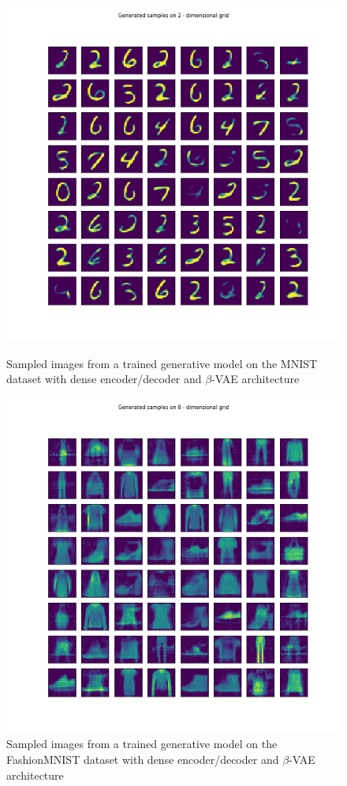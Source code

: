 \documentclass[12pt, english]{article}
\begin{document}
\begin{figure}[ht] 
  \begin{minipage}{0.48\linewidth}
    \centering
    \includegraphics[width=.65\linewidth]{gen/generated_samples_mnist_dense_vae.png}
    \caption{Sampled images from a trained generative model on the MNIST dataset with dense encoder/decoder and $\beta$-VAE architecture}
    \label{fig:sampled-images-1}
  \end{minipage}\hfill
  \begin{minipage}{0.48\linewidth}
    \centering
    \includegraphics[width=.65\linewidth]{gen/generated_samples_fashion_mnist_dense_vae.png} 
    \caption{Sampled images from a trained generative model on the FashionMNIST dataset with dense encoder/decoder and $\beta$-VAE architecture} 
    \label{fig:sampled-images-2}
  \end{minipage} 
\end{figure}
\end{document}
